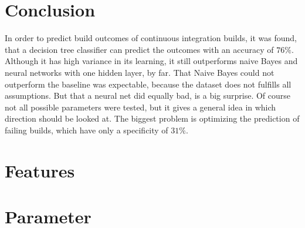 \documentclass[a4paper,11pt]{article}
\begin{document}
\section{Conclusion}	

In order to predict build outcomes of continuous integration builds, it was found, that a decision tree classifier can predict the outcomes with an accuracy of $76\%$. Although it has high variance in its learning, it still outperforms naive Bayes and neural networks with one hidden layer, by far. That Naive Bayes could not outperform the baseline was expectable, because the dataset does not fulfills all assumptions. But that a neural net did equally bad, is a big surprise. Of course not all possible parameters were tested, but it gives a general idea in which direction should be looked at. The biggest problem is optimizing the prediction of failing builds, which have only a specificity of $31\%$. 





\appendix
\setcounter{table}{0}
\renewcommand{\thetable}{\Alph{section}\arabic{table}}

\section{Features}



\section{Parameter}
\setcounter{table}{0}



\end{document}
